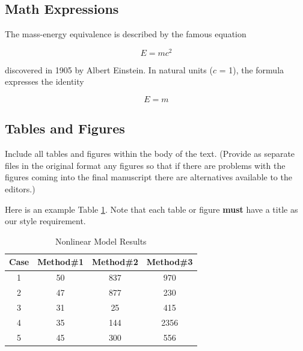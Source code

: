 \documentclass{article}
\begin{document}
\subsection{Math Expressions}
The mass-energy equivalence is described by the famous equation

$$E=mc^2$$

discovered in 1905 by Albert Einstein.
In natural units ($c$ = 1), the formula expresses the identity

\begin{equation}
E=m
\end{equation}

\subsection{Tables and Figures}
Include all tables and figures within the body of the text. (Provide as separate
files in the original format any figures so that if there are problems with the
figures coming into the final manuscript there are alternatives available to the editors.)

Here is an example Table \ref{table:nonlin}. Note that each table or figure \textbf{must} have
a title as our style requirement.

\begin{table}[ht]
\caption{Nonlinear Model Results} %
\label{table:nonlin} %
\centering %
\begin{tabular}{c c c c} %
\hline\hline %
Case & Method\#1 & Method\#2 & Method\#3 \\ [0.5ex] %
\hline %
1 & 50 & 837 & 970 \\ %
2 & 47 & 877 & 230 \\
3 & 31 & 25 & 415 \\
4 & 35 & 144 & 2356 \\
5 & 45 & 300 & 556 \\ [1ex] %
\hline %
\end{tabular}
\end{table}
\end{document}
